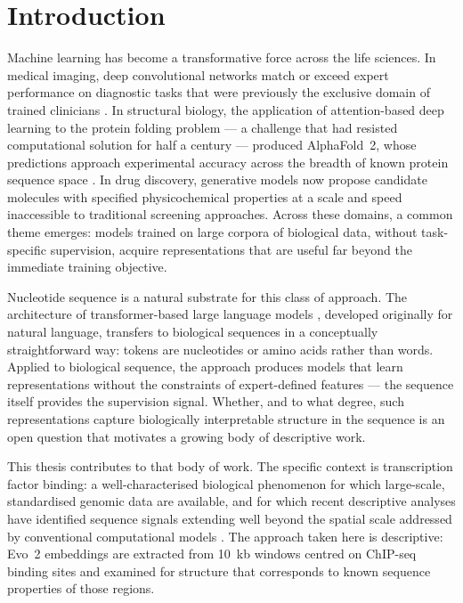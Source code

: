 \chapter*{Introduction}

\shorthandoff{-}

Machine learning has become a transformative force across the life sciences.
In medical imaging, deep convolutional networks match or exceed expert performance on
diagnostic tasks that were previously the exclusive domain of trained clinicians
\cite{greenerGuideMachineLearning2021}.
In structural biology, the application of attention-based deep learning to the protein
folding problem --- a challenge that had resisted computational solution for half a century
--- produced AlphaFold~2, whose predictions approach experimental accuracy across the
breadth of known protein sequence space \cite{jumperHighlyAccurateProtein2021}.
In drug discovery, generative models now propose candidate molecules with specified
physicochemical properties at a scale and speed inaccessible to traditional screening
approaches.
Across these domains, a common theme emerges: models trained on large corpora of
biological data, without task-specific supervision, acquire representations that are useful
far beyond the immediate training objective.

Nucleotide sequence is a natural substrate for this class of approach.
The architecture of transformer-based large language models \cite{vaswaniAttentionAllYou2017},
developed originally for natural language, transfers to biological sequences in a
conceptually straightforward way: tokens are nucleotides or amino acids rather than words.
Applied to biological sequence, the approach produces models that learn representations
without the constraints of expert-defined features --- the sequence itself provides the
supervision signal.
Whether, and to what degree, such representations capture biologically interpretable
structure in the sequence is an open question that motivates a growing body of
descriptive work.

This thesis contributes to that body of work.
The specific context is transcription factor binding: a well-characterised biological
phenomenon for which large-scale, standardised genomic data are available, and for which
recent descriptive analyses have identified sequence signals extending well beyond the
spatial scale addressed by conventional computational models
\cite{faltejskovaNonconsensusFlankingSequence2026a}.
The approach taken here is descriptive: Evo~2 embeddings \cite{brixiGenomeModellingDesign2026}
are extracted from 10~kb windows centred on ChIP-seq binding sites and examined for
structure that corresponds to known sequence properties of those regions.

\shorthandon{-}


\shorthandoff{-}\shorthandon{-}



